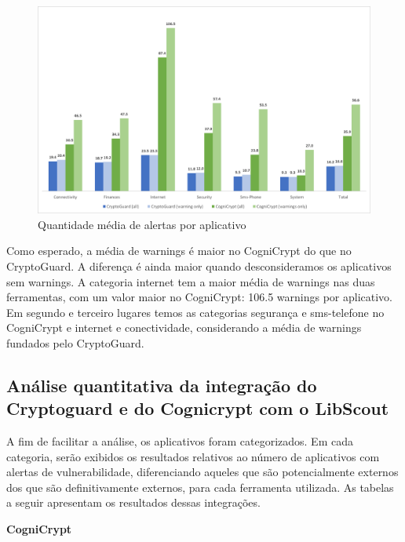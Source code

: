 \begin{figure}[!ht]
    \centering
    \includegraphics[scale=0.3]{img/averageWarnings.png}
    \caption{Quantidade média de alertas por aplicativo}
    \label{averageWarnings}
\end{figure}

Como esperado, a média de warnings é maior no CogniCrypt do que no CryptoGuard. A diferença é ainda maior quando desconsideramos os aplicativos sem warnings. A categoria internet tem a maior média de warnings nas duas ferramentas, com um valor maior no CogniCrypt: 106.5 warnings por aplicativo. Em segundo e terceiro lugares temos as categorias segurança e sms-telefone no CogniCrypt e internet e conectividade, considerando a média de warnings fundados pelo CryptoGuard. \cite{perception_developers}

\subsection{Análise quantitativa da integração do Cryptoguard e do Cognicrypt com o LibScout}

A fim de facilitar a análise, os aplicativos foram categorizados. Em cada categoria, serão exibidos os resultados relativos ao número de aplicativos com alertas de vulnerabilidade, diferenciando aqueles que são potencialmente externos dos que são definitivamente externos, para cada ferramenta utilizada. As tabelas a seguir apresentam os resultados dessas integrações.

\textbf{CogniCrypt}

